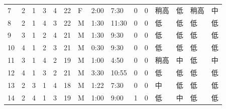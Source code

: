\begin{table}[htbp]
{\begin{tabular}{lllllllllllllll}
7                   & 2                      & 1                       & 3                      & 4                       & 22                     & F                   & 2:00                  & 7:30                  & 0                    & 0                    & 稍高      & 低       & 稍高   & 中  \\
8                   & 2                      & 1                       & 4                      & 3                       & 22                     & M                   & 1:30                  & 11:30                 & 0                    & 0                    & 低       & 低       & 低    & 低  \\
9                   & 3                      & 1                       & 2                      & 4                       & 21                     & M                   & 1:30                  & 9:30                  & 0                    & 0                    & 低       & 低       & 低    & 低  \\
10                  & 4                      & 1                       & 2                      & 3                       & 21                     & M                   & 0:30                  & 9:30                  & 0                    & 0                    & 低       & 低       & 低    & 低  \\
11                  & 3                      & 1                       & 4                      & 2                       & 19                     & M                   & 1:00                  & 4:50                  & 0                    & 0                    & 稍高      & 中       & 低    & 中  \\
12                  & 4                      & 1                       & 3                      & 2                       & 21                     & M                   & 3:30                  & 10:55                 & 0                    & 0                    & 低       & 低       & 低    & 低  \\
13                  & 2                      & 3                       & 1                      & 4                       & 18                     & M                   & 1:22                  & 7:30                  & 0                    & 0                    & 中       & 低       & 低    & 低  \\
14                  & 2                      & 4                       & 1                      & 3                       & 19                     & M                   & 1:00                  & 9:00                  & 1                    & 0                    & 低       & 中       & 低    & 低  \\

\end{tabular}}
\end{table}

